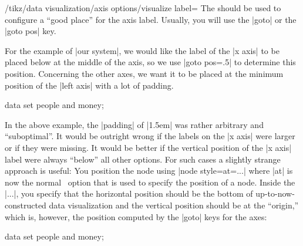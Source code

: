 \begin{key}{/tikz/data visualization/axis options/visualize label=}
  The  should be used to configure a ``good place'' for
  the axis label. Usually, you will use the |goto| or the |goto pos|
  key.

  For the example of |our system|, we would like the label of the
  |x axis| to be placed below at the middle of the axis, so we use
  |goto pos=.5| to determine this position. Concerning the other axes,
  we want it to be placed at the minimum position of the |left axis|
  with a lot of padding.
\begin{codeexample}[width=7cm]
\tikz \datavisualization [
    our system,     
    x axis={attribute=time, ticks=some, label},
    left axis ={attribute=money},
    right axis={attribute=people},
    visualize as line/.list={
      people 1, people 2, money 1, money 2}]
  data set {people and money};  
\end{codeexample}

  In the above example, the |padding| of |1.5em| was rather arbitrary
  and ``suboptimal''. It would be outright wrong if the labels on the |x axis| were larger or
  if they were missing. It would be better if the vertical position of
  the |x axis| label were always ``below'' all other options. For such
  cases a slightly strange approach is useful: You position the node
  using |node style={at=...}| where |at| 
  is now the normal \tikzname\ option that is used to specify the
  position of a node. Inside the |...|, you specify that the
  horizontal position should be the bottom of up-to-now-constructed
  data visualization and the vertical position should be at the
  ``origin,'' which is, however, the position computed by the |goto|
  keys for the axes:
\begin{codeexample}[width=7cm]
\tikz \datavisualization [
    our system,     
    x axis={attribute=time, ticks=some, label=Year},
    left axis ={attribute=money},
    right axis={attribute=people},
    visualize as line/.list={
      people 1, people 2, money 1, money 2}]
  data set {people and money};  
\end{codeexample}


\end{key}
